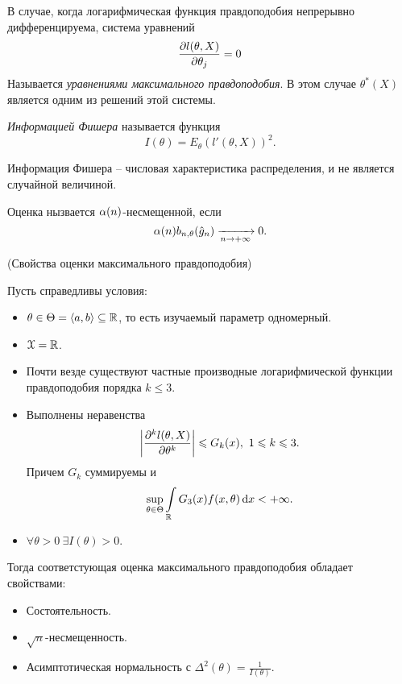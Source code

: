 \begin{definition}
    В случае, когда логарифмическая функция правдоподобия непрерывно
    дифференцируема, система уравнений
    \[
        \pderv{l(\theta, X)}{\theta_j} = 0
    \]
    Называется \textit{уравнениями максимального правдоподобия}. В этом случае
    $\theta^*(X)$ является одним из решений этой системы.
\end{definition}

\begin{definition}
    \textit{Информацией Фишера} называется функция
    \[
        I(\theta) = E_\theta(l'(\theta, X))^2
    .\]
\end{definition}

\begin{remark}
    Информация Фишера -- числовая характеристика распределения, и не является
    случайной величиной.
\end{remark}

\begin{definition}
    Оценка нызвается $\a(n)$-несмещенной, если
    \[
        \a(n) b_{n, \theta}(\hat{g}_n) \xrightarrow[n \to +\infty]{} 0
    .\]
\end{definition}

\begin{theorem}(Свойства оценки максимального правдоподобия)

    Пусть справедливы условия:
    \begin{itemize}
        \item $\theta \in \Theta = \langle a, b \rangle \subseteq \R$,
            то есть изучаемый параметр одномерный.
        \item $\cX = \R$.
        \item Почти везде существуют частные производные логарифмической
            функции правдоподобия порядка $k \leqslant 3$.
        \item Выполнены неравенства
            \[
                \abs*{\hderv{k}{l(\theta, X)}{\theta^k}} \leqslant G_k(x),~ 1
                \leqslant k \leqslant 3
            .\]
            Причем $G_k$ суммируемы и
            \[
                \sup_{\theta \in \Theta}{\intl_\R{G_3(x) f(x, \theta) \dd x}}
                < +\infty
            .\]
        \item $\forall \theta > 0~ \exists I(\theta) > 0$.
    \end{itemize}
    Тогда соответстующая оценка максимального правдоподобия обладает свойствами:
    \begin{itemize}
        \item Состоятельность.
        \item $\sqrt{n}$-несмещенность.
        \item Асимптотическая нормальность с $\displaystyle \Delta^2(\theta) =
            \frac{1}{I(\theta)}$.
    \end{itemize}
\end{theorem}

